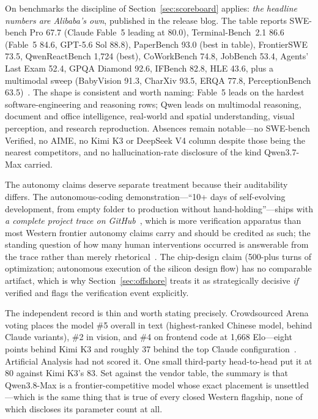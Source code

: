 On benchmarks the discipline of Section~\ref{sec:scoreboard} applies: \emph{the headline numbers are Alibaba's own}, published in the release blog. The table reports SWE-bench Pro 67.7 (Claude Fable~5 leading at 80.0), Terminal-Bench~2.1 86.6 (Fable~5 84.6, GPT-5.6 Sol 88.8), PaperBench 93.0 (best in table), FrontierSWE 73.5, QwenReactBench 1{,}724 (best), CoWorkBench 74.8, JobBench 53.4, Agents' Last Exam 52.4, GPQA Diamond 92.6, IFBench 82.8, HLE 43.6, plus a multimodal sweep (BabyVision 91.3, CharXiv 93.5, ERQA 77.8, PerceptionBench 63.5)~\cite{qwen38-bench,qwen-announcement}. The shape is consistent and worth naming: Fable~5 leads on the hardest software-engineering and reasoning rows; Qwen leads on multimodal reasoning, document and office intelligence, real-world and spatial understanding, visual perception, and research reproduction. Absences remain notable---no SWE-bench Verified, no AIME, no Kimi K3 or DeepSeek V4 column despite those being the nearest competitors, and no hallucination-rate disclosure of the kind Qwen3.7-Max carried.

The autonomy claims deserve separate treatment because their auditability differs. The autonomous-coding demonstration---``10+ days of self-evolving development, from empty folder to production without hand-holding''---ships with \emph{a complete project trace on GitHub}~\cite{qwen-announcement}, which is more verification apparatus than most Western frontier autonomy claims carry and should be credited as such; the standing question of how many human interventions occurred is answerable from the trace rather than merely rhetorical~\cite{infoworld-qwen}. The chip-design claim (500-plus turns of optimization; autonomous execution of the silicon design flow) has no comparable artifact, which is why Section~\ref{sec:offshore} treats it as strategically decisive \emph{if} verified and flags the verification event explicitly.

The independent record is thin and worth stating precisely. Crowdsourced Arena voting places the model \#5 overall in text (highest-ranked Chinese model, behind Claude variants), \#2 in vision, and \#4 on frontend code at 1,668 Elo---eight points behind Kimi K3 and roughly 37 behind the top Claude configuration~\cite{arena-qwen38}. Artificial Analysis had not scored it. One small third-party head-to-head put it at 80 against Kimi K3's 83. Set against the vendor table, the summary is that Qwen3.8-Max is a frontier-competitive model whose exact placement is unsettled---which is the same thing that is true of every closed Western flagship, none of which discloses its parameter count at all.

